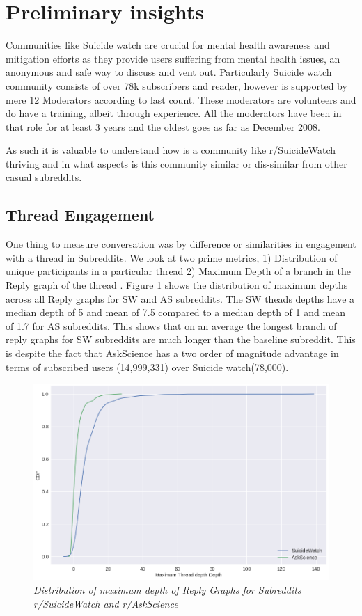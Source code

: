 \section{Preliminary insights}
Communities like Suicide watch are crucial for mental health awareness and mitigation efforts as they provide users suffering from mental health issues, an anonymous and safe way to discuss and vent out.
Particularly Suicide watch community consists of over 78k subscribers and reader, however is supported by mere 12 Moderators according to last count. These moderators are volunteers and do have a training, albeit through experience. All the moderators have been in that role for at least 3 years and the oldest goes as far as December 2008. 

As such it is valuable to understand how is a community like r/SuicideWatch thriving and in what aspects is this community similar or dis-similar from other casual subreddits. 

\subsection{Thread Engagement}
One thing to measure conversation was by difference or similarities in engagement with a thread in Subreddits. We look at two prime metrics, 1) Distribution of unique participants in a particular thread  2) Maximum Depth of a branch in the Reply graph of the thread . 
Figure \ref{fig:depthDist} shows the distribution of maximum depths across all Reply graphs for SW and AS subreddits. The SW theads depths have a median depth of 5 and mean of 7.5 compared to a median depth of 1 and mean of 1.7 for AS subreddits. This shows that on an average the longest branch of reply graphs for SW subreddits are much longer than the baseline subreddit. This is despite the fact that AskScience has a two order of magnitude advantage in terms of subscribed users (14,999,331) over Suicide watch(78,000). 
\begin{figure}[!h]
	\centering
	\includegraphics[width=0.5\columnwidth]{Figures/depthDist}
	\caption{\textsl{ Distribution of maximum depth of Reply Graphs for Subreddits r/SuicideWatch and r/AskScience }}
	\label{fig:depthDist}
\end{figure}


